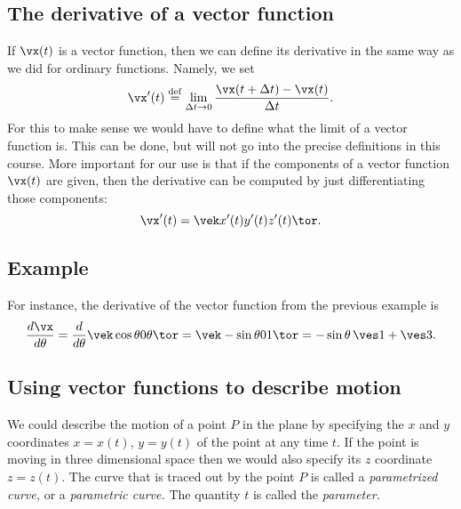 \subsection{The derivative of a vector function} %
If $\vx(t)$ is a vector function, then we can define its derivative in
the same way as we did for ordinary functions. Namely, we set
\[
\vx'(t) \stackrel{\rm def}= \lim_{\Delta t\to0} \frac{\vx(t+\Delta t)
  - \vx(t)}{\Delta t}.
\]
For this to make sense we would have to define what the limit of a
vector function is.  This can be done, but will not go into the
precise definitions in this course.  More important for our use is
that if the components of a vector function $\vx(t)$ are given, then
the derivative can be computed by just differentiating those
components:
\begin{equation}
  \vx'(t) = \vek
  x'(t) \\ y'(t) \\z'(t)
  \tor.
  \label{eq:derivative-of-vector-function}
\end{equation}
\subsection*{Example} For instance, the derivative of the vector
function from the previous example is
\[
\frac{d\vx}{d\theta} = \frac{d}{d\theta}\vek\cos \theta \\ 0
\\\theta\tor = \vek - \sin\theta \\ 0 \\ 1 \tor = -\sin\theta\,\ves1 +
\ves3.
\]

\subsection{Using vector functions to describe motion} %
We could describe the motion of a point $P$ in the plane by specifying
the $x$ and $y$ coordinates $x=x(t)$, $y=y(t)$ of the point at any
time $t$.  If the point is moving in three dimensional space then we
would also specify its $z$ coordinate $z=z(t)$.  The curve that is
traced out by the point $P$ is called a \emph{parametrized curve,} or
a \emph{parametric curve.}  The quantity $t$ is called the
\emph{parameter.}

